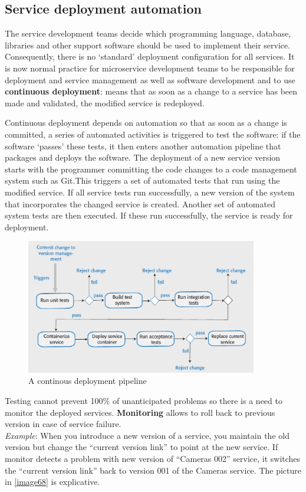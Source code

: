 \documentclass[10pt,a4paper]{report}
\begin{document}
\subsection{Service deployment automation}
The service development teams decide which programming language, database, libraries and other support software should be used to implement their service. Consequently, there is no ‘standard’ deployment configuration
for all services.
It is now normal practice for microservice development teams to be responsible for deployment and service management as well as software development and to use \textbf{continuous deployment}: means that as soon as a change to a service has
been made and validated, the modified service is redeployed.

Continuous deployment depends on automation so that as soon as a change is committed, a series of automated activities is triggered to test the software: if the software ‘passes’ these tests, it then enters another automation pipeline that packages and deploys the software.
The deployment of a new service version starts with the programmer committing the code changes to a code management system such as Git.This triggers a set of automated tests that run using the modified service.
If all service tests run successfully, a new version of the system that incorporates the changed service is created.
Another set of automated system tests are then executed. If these run successfully, the service is ready for deployment.
\begin{figure}[h]
	\centering
	\includegraphics[width=0.9\textwidth]{image67}
	\caption{A continous deployment pipeline}
	\label{image67}
\end{figure} 


Testing cannot prevent 100\% of unanticipated problems so there is a need to monitor the deployed services. 
\textbf{Monitoring} allows to roll back to previous version in case of service failure.\\
\textit{Example}: When you introduce a new version of a service, you maintain the old version but
change the “current version link” to point at the new service.
If monitor detects a problem with new version of “Cameras 002” service, it switches
the “current version link” back to version 001 of the Cameras service. The picture in \ref{image68} is explicative.
\end{document}
